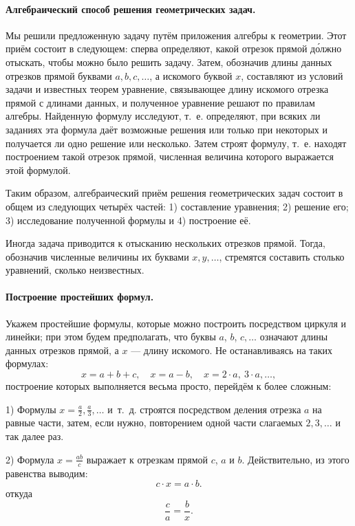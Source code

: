 \documentclass[oneside]{book}
\begin{document}
\paragraph{Алгебраический способ решения геометрических задач.}\label{1938/210}
Мы решили предложенную задачу путём приложения алгебры к геометрии.
Этот приём состоит в следующем:
сперва определяют, какой отрезок прямой д\'{о}лжно отыскать, чтобы можно было решить задачу.
Затем, обозначив длины данных отрезков прямой %
буквами $a, b, c,\dots$, а искомого буквой $x$, составляют из условий задачи и известных теорем уравнение, связывающее длину искомого отрезка прямой с длинами данных, и полученное уравнение решают по правилам алгебры.
Найденную формулу исследуют, т.~е. определяют, при всяких ли заданиях эта формула даёт возможные решения или только при некоторых и получается ли одно решение или несколько.
Затем строят формулу, т.~е. находят построением такой отрезок прямой, численная величина которого выражается этой формулой.

Таким образом, алгебраический приём решения геометрических задач состоит в общем из следующих четырёх частей:
1) составление уравнения;
2) решение его;
3) исследование полученной формулы и 4) построение её.

Иногда задача приводится к отысканию нескольких отрезков прямой.
Тогда, обозначив численные величины их буквами $x,y,\dots$, стремятся составить столько уравнений, сколько неизвестных.

\paragraph{Построение простейших формул.}\label{1938/211}
Укажем простейшие формулы, которые можно построить посредством циркуля и линейки;
при этом будем предполагать, что буквы $a$, $b$, $c,\dots$
означают длины данных отрезков прямой, а $x$ — длину искомого.
Не останавливаясь на таких формулах:
\[x=a+b+c,
 \quad
 x=a-b,
 \quad
 x=2\cdot a,\ 3\cdot a,\dots,
\]
построение которых выполняется весьма просто, перейдём к более сложным:


1) Формулы $x=\frac a2, \frac a3,\dots$ и~т.~д. строятся посредством деления отрезка $a$ на равные части, затем, если нужно, повторением одной части слагаемых $2, 3,\dots$ и так далее раз.

2) Формула $x=\frac{ab}c$ выражает  к отрезкам прямой $c$, $a$ и $b$.
Действительно, из этого равенства выводим:
\[c\cdot x=a\cdot b.\]
откуда
\[\frac ca=\frac bx.\]
\end{document}
